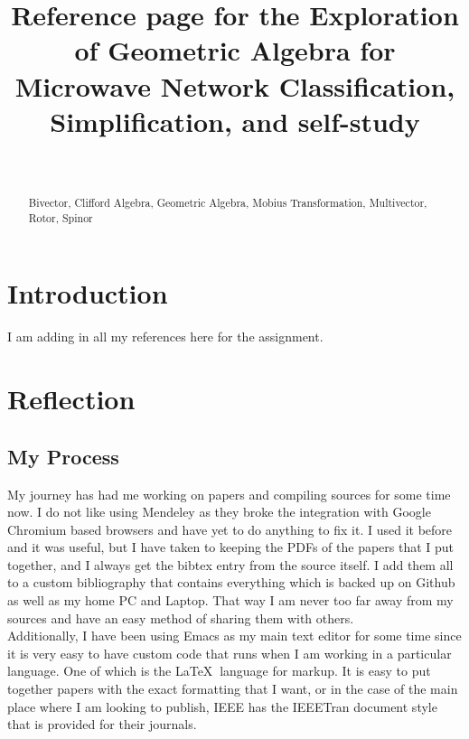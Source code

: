 \documentclass[journal]{IEEEtran}
\begin{document}
\title{Reference page for the Exploration of Geometric Algebra for Microwave Network Classification, Simplification, and self-study }

\author{
    \\
    }

\maketitle

\IEEEpeerreviewmaketitle
\begin{abstract}
  \begin{IEEEkeywords}
Bivector,
Clifford Algebra,
Geometric Algebra, 
Mobius Transformation,
Multivector, 
Rotor, 
Spinor
\end{IEEEkeywords}

\end{abstract}


\section{Introduction}
I am adding in all my references here for the assignment. 
  \cite{Montoya_9248978}
  \cite{Montoya_9808623}
  \cite{Zhang_9943322}
  \cite{Li_9913488}
  \cite{Franchini_6783758}
  \cite{Eid_9992202}
  \cite{Corrochano_9488174}
  \cite{Neve_10345560}
  \cite{Arsenovic_7982607}
  \cite{scikit_9632487}
\section{Reflection}
\subsection{My Process}
\noindent
My journey has had me working on papers and compiling sources for some time now. I do not like using Mendeley as they broke the integration with Google Chromium based browsers and have yet to do anything to fix it. I used it before and it was useful, but I have taken to keeping the PDFs of the papers that I put together, and I always get the bibtex entry from the source itself. I add them all to a custom bibliography that contains everything which is backed up on Github as well as my home PC and Laptop. That way I am never too far away from my sources and have an easy method of sharing them with others.\\
Additionally, I have been using Emacs as my main text editor for some time since it is very easy to have custom code that runs when I am working in a particular language. One of which is the \LaTeX $\ $ language for markup. It is easy to put together papers with the exact formatting that I want, or in the case of the main place where I am looking to publish, IEEE has the IEEETran document style that is provided for their journals.  
\end{document}
